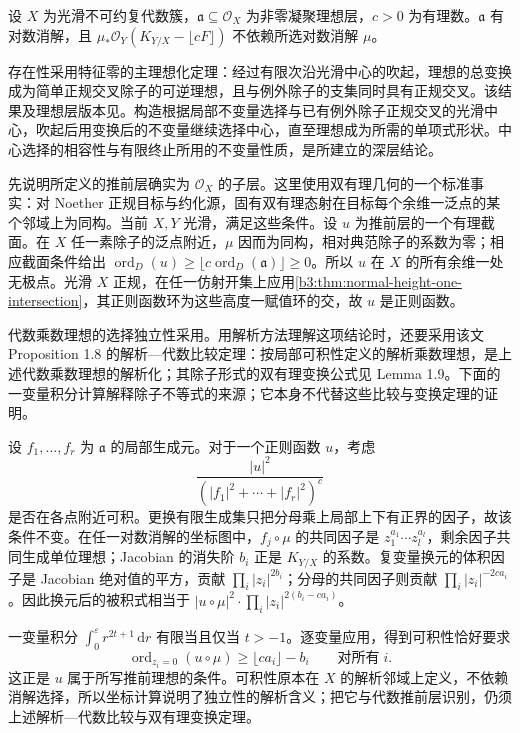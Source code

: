 \begin{theorem}\label{b3:thm:log-resolution-multiplier-independence}
	设 \(X\) 为光滑不可约复代数簇，\(\mathfrak a\subseteq\mathcal O_X\) 为非零凝聚理想层，\(c>0\) 为有理数。\(\mathfrak a\) 有对数消解，且 \(\mu_*\mathcal O_Y(K_{Y/X}-\lfloor cF\rfloor)\) 不依赖所选对数消解 \(\mu\)。
\end{theorem}
\begin{proofsketch}
	存在性采用特征零的主理想化定理：经过有限次沿光滑中心的吹起，理想的总变换成为简单正规交叉除子的可逆理想，且与例外除子的支集同时具有正规交叉。该结果及理想层版本见\cite[Theorem 1.10, Remark 1.18]{BierstoneMilman1997CanonicalResolution}。构造根据局部不变量选择与已有例外除子正规交叉的光滑中心，吹起后用变换后的不变量继续选择中心，直至理想成为所需的单项式形状。中心选择的相容性与有限终止所用的不变量性质，是\cite[Theorem 1.14, Remark 1.18]{BierstoneMilman1997CanonicalResolution}所建立的深层结论。

	先说明所定义的推前层确实为 \(\mathcal O_X\) 的子层。这里使用双有理几何的一个标准事实：对 Noether 正规目标与约化源，固有双有理态射在目标每个余维一泛点的某个邻域上为同构。当前 \(X,Y\) 光滑，满足这些条件。设 \(u\) 为推前层的一个有理截面。在 \(X\) 任一素除子的泛点附近，\(\mu\) 因而为同构，相对典范除子的系数为零；相应截面条件给出 \(\operatorname{ord}_D(u)\ge\lfloor c\operatorname{ord}_D(\mathfrak a)\rfloor\ge0\)。所以 \(u\) 在 \(X\) 的所有余维一处无极点。光滑 \(X\) 正规，在任一仿射开集上应用\cref{b3:thm:normal-height-one-intersection}，其正则函数环为这些高度一赋值环的交，故 \(u\) 是正则函数。

	代数乘数理想的选择独立性采用\cite[Lecture 1, Proposition 1.6]{Lazarsfeld2010ShortCourse}。用解析方法理解这项结论时，还要采用该文 Proposition 1.8 的解析—代数比较定理：按局部可积性定义的解析乘数理想，是上述代数乘数理想的解析化；其除子形式的双有理变换公式见 Lemma 1.9。下面的一变量积分计算解释除子不等式的来源；它本身不代替这些比较与变换定理的证明。

	设 \(f_1,\ldots,f_r\) 为 \(\mathfrak a\) 的局部生成元。对于一个正则函数 \(u\)，考虑
	\[
		\frac{|u|^2}{(|f_1|^2+\cdots+|f_r|^2)^c}
	\]
	是否在各点附近可积。更换有限生成集只把分母乘上局部上下有正界的因子，故该条件不变。在任一对数消解的坐标图中，\(f_j\circ\mu\) 的共同因子是 \(z_1^{a_1}\cdots z_l^{a_l}\)，剩余因子共同生成单位理想；Jacobian 的消失阶 \(b_i\) 正是 \(K_{Y/X}\) 的系数。复变量换元的体积因子是 Jacobian 绝对值的平方，贡献 \(\prod_i|z_i|^{2b_i}\)；分母的共同因子则贡献 \(\prod_i|z_i|^{-2ca_i}\)。因此换元后的被积式相当于 \( |u\circ\mu|^2\cdot\prod_i|z_i|^{2(b_i-ca_i)}\)。

	一变量积分 \(\int_0^\varepsilon r^{2t+1}\,\mathrm{d}r\) 有限当且仅当 \(t>-1\)。逐变量应用，得到可积性恰好要求
	\[
		\operatorname{ord}_{z_i=0}(u\circ\mu) \ge\lfloor ca_i\rfloor-b_i\qquad\text{对所有}\;i.
	\]
	这正是 \(u\) 属于所写推前理想的条件。可积性原本在 \(X\) 的解析邻域上定义，不依赖消解选择，所以坐标计算说明了独立性的解析含义；把它与代数推前层识别，仍须上述解析—代数比较与双有理变换定理。
\end{proofsketch}

